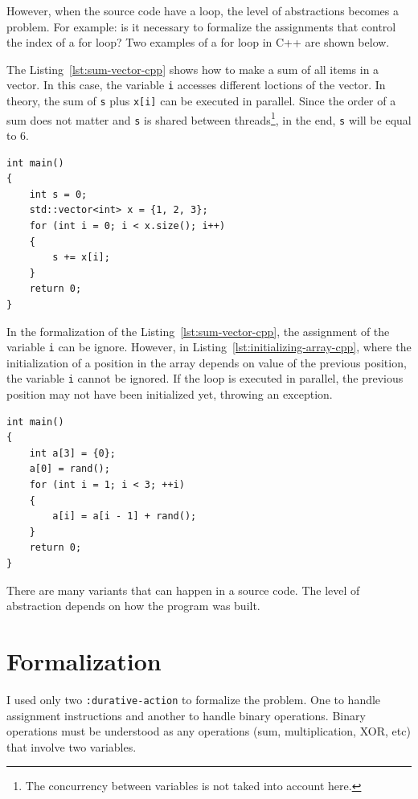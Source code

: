 \documentclass[letterpaper]{article}
\begin{document}
However, when the source code have a loop, the level of abstractions becomes a problem. For example: is it necessary to formalize the assignments that control the index of a for loop? Two examples of a for loop in C++ are shown below.

The Listing~\ref{lst:sum-vector-cpp} shows how to make a sum of all items in a vector. In this case, the variable \texttt{i} accesses different loctions of the vector. In theory, the sum of \texttt{s} plus \texttt{x[i]} can be executed in parallel. Since the order of a sum does not matter and \texttt{s} is shared between threads\footnote{The concurrency between variables is not taked into account here.}, in the end, \texttt{s} will be equal to 6.

\begin{lstlisting}[caption=Sum of vector - C++,label=lst:sum-vector-cpp,style=cppStyle]
int main()
{
    int s = 0;
    std::vector<int> x = {1, 2, 3};
    for (int i = 0; i < x.size(); i++)
    {
        s += x[i];
    }
    return 0;
}
\end{lstlisting}

In the formalization of the Listing~\ref{lst:sum-vector-cpp}, the assignment of the variable \texttt{i} can be ignore. However, in Listing~\ref{lst:initializing-array-cpp}, where the initialization of a position in the array depends on value of the previous position, the variable \texttt{i} cannot be ignored. If the loop is executed in parallel, the previous position may not have been initialized yet, throwing an exception.

\begin{lstlisting}[caption=Initializing array - C++,label=lst:initializing-array-cpp,style=cppStyle]
int main()
{
    int a[3] = {0};
    a[0] = rand();
    for (int i = 1; i < 3; ++i)
    {
        a[i] = a[i - 1] + rand();
    }
    return 0;
}
\end{lstlisting}

There are many variants that can happen in a source code. The level of abstraction depends on how the program was built.


\section{Formalization}

I used only two \texttt{:durative-action} to formalize the problem. One to handle assignment instructions and another to handle binary operations. Binary operations must be understood as any operations (sum, multiplication, XOR, etc) that involve two variables.
\end{document}

